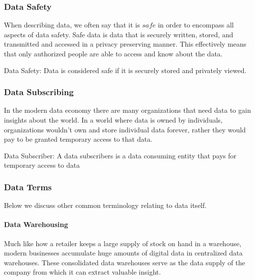 \subsubsection{Data Safety}

When describing data, we often say that it is $\textit{safe}$ in order to encompass all aspects of data safety. Safe data is data that is securely written, stored, and transmitted and accessed in a privacy preserving manner. This effectively means that only authorized people are able to access and know about the data.

\begin{definition}
\label{definition:DataSafety}
Data Safety: Data is considered safe if it is securely stored and privately viewed.
\end{definition}

\subsubsection{Data Subscribing}
In the modern data economy there are many organizations that need data to gain insights about the world. In a world where data is owned by individuals, organizations wouldn't own and store individual data forever, rather they would pay to be granted temporary access to that data.

\begin{definition}
\label{definition:DataSubscriber}
Data Subscriber: A data subscribers is a data consuming entity that pays for temporary access to data
\end{definition}


\subsubsection{Data Terms}
Below we discuss other common terminology relating to data itself.

\paragraph{Data Warehousing}
Much like how a retailer keeps a large supply of stock on hand in a warehouse, modern businesses accumulate huge amounts of digital data in centralized data warehouses. These consolidated data warehouses serve as the data supply of the company from which it can extract valuable insight.

